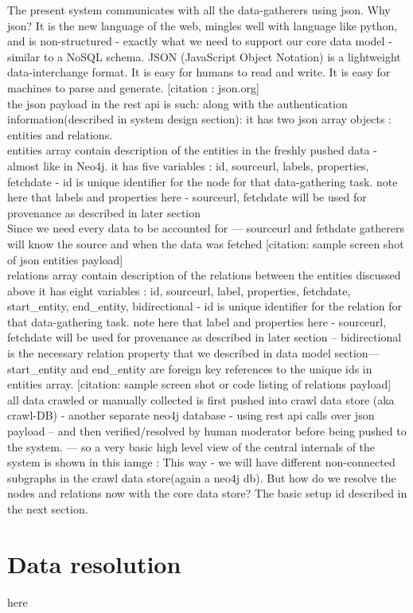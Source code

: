 The present system communicates with all the data-gatherers using json. Why json? It is the new language of the web, mingles well with language like python, and is non-structured - exactly what we need to support our core data model - similar to a NoSQL schema. JSON (JavaScript Object Notation) is a lightweight data-interchange format. It is easy for humans to read and write. It is easy for machines to parse and generate. [citation : json.org]   \\

the json payload in the rest api is such: along with the authentication information(described in system design section): it has two json array objects : entities and relations. \\

entities array contain description of the entities in the freshly pushed data - almost like in Neo4j. 
it has five variables : id, sourceurl, labels, properties, fetchdate - id is unique identifier for the node for that data-gathering task. note here that labels and properties here  - sourceurl, fetchdate will be used for provenance as described in later section \\


Since we need every data to be accounted for ---  sourceurl and fethdate
gatherers will know the source and when the data was fetched 
[citation: sample screen shot of json entities payload] \\

relations array contain description of the relations between the entities discussed above 
it has eight variables : id, sourceurl, label, properties, fetchdate, start\_entity, end\_entity, bidirectional - id is unique identifier for the relation for that data-gathering task. note here that label and properties here  - sourceurl, fetchdate will be used for provenance as described in later section -- bidirectional is the necessary relation property that we described in data model section---start\_entity and end\_entity are foreign key references to the unique ids in entities array.  
[citation: sample screen shot or code listing of relations payload] \\

all data crawled or manually collected is first pushed into crawl data store (aka crawl-DB) -  another separate neo4j database -  using rest api calls over json payload -- and then verified/resolved by human moderator before being pushed to the system. --- so a very basic high level view of the central internals of the system is shown in this iamge : 
This way - we will have different non-connected subgraphs in the crawl data store(again a neo4j db).  
But how do we resolve the nodes and relations now with the core data store? The basic setup id described in the next section. \\


\section{Data resolution}

here